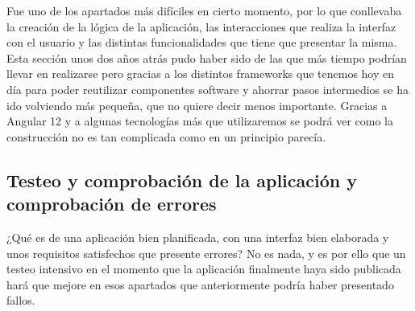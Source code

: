 Fue uno de los apartados más difíciles en cierto momento, por lo que conllevaba la creación de la lógica de la aplicación, las interacciones que realiza la interfaz con el usuario y las distintas funcionalidades que tiene que presentar la misma. Esta sección unos dos años atrás pudo haber sido de las que más tiempo podrían llevar en realizarse pero gracias a los distintos frameworks que tenemos hoy en día para poder reutilizar componentes software y ahorrar pasos intermedios se ha ido volviendo más pequeña, que no quiere decir menos importante. Gracias a Angular 12 y a algunas tecnologías más que utilizaremos se podrá ver como la construcción no es tan complicada como en un principio parecía.

\subsection{Testeo y comprobación de la aplicación y comprobación de errores}

¿Qué es de una aplicación bien planificada, con una interfaz bien elaborada y unos requisitos satisfechos que presente errores? No es nada, y es por ello que un testeo intensivo en el momento que la aplicación finalmente haya sido publicada hará que mejore en esos apartados que anteriormente podría haber presentado fallos.



